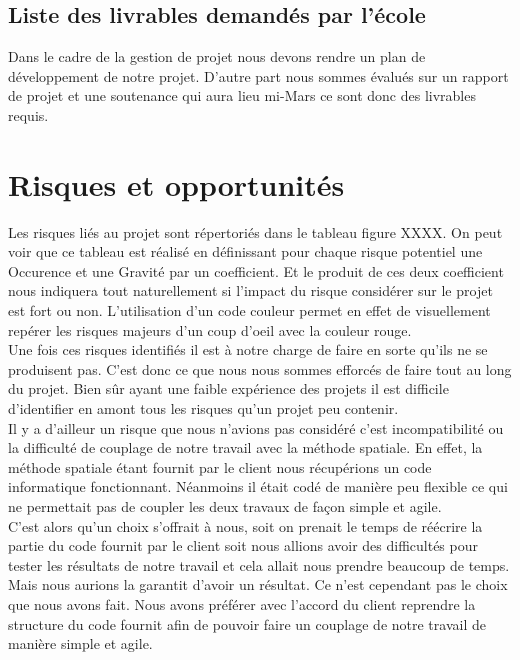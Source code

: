 \documentclass[a4paper,12pt]{report}
\theoremstyle{break}
\begin{document}
\section{Liste des livrables demandés par l’école }

    Dans le cadre de la gestion de projet nous devons rendre un plan de développement de notre projet. D’autre part nous sommes évalués sur un rapport de projet et une soutenance qui aura lieu mi-Mars ce sont donc des livrables requis. 

\chapter{Risques et opportunités}
 
  Les risques liés au projet sont répertoriés dans le tableau figure XXXX. On peut voir que ce tableau est réalisé en définissant pour chaque risque potentiel une Occurence et une Gravité par un coefficient. Et le produit de ces deux coefficient nous indiquera tout naturellement si l'impact du risque considérer sur le projet est fort ou non. L'utilisation d'un code couleur permet en effet de visuellement repérer les risques majeurs d'un coup d'oeil avec la couleur rouge. \\
  
  Une fois ces risques identifiés il est à notre charge de faire en sorte qu'ils ne se produisent pas. C'est donc ce que nous nous sommes efforcés de faire tout au long du projet. Bien sûr ayant une faible expérience des projets il est difficile d'identifier en amont tous les risques qu'un projet peu contenir. \\
  
  Il y a d'ailleur un risque que nous n’avions pas considéré c’est incompatibilité ou la difficulté de couplage de notre travail avec la méthode spatiale. En effet, la méthode spatiale étant fournit par le client nous récupérions un code informatique fonctionnant. Néanmoins il était codé de manière peu flexible ce qui ne permettait pas de coupler les deux travaux de façon simple et agile.\\
  
 C'est alors qu'un choix s'offrait à nous, soit on prenait le temps de réécrire la partie du code fournit par le client soit nous allions avoir des difficultés pour tester les résultats de notre travail et cela allait nous prendre beaucoup de temps. Mais nous aurions la garantit d'avoir un résultat. Ce n'est cependant pas le choix que nous avons fait. Nous avons préférer avec l'accord du client reprendre la structure du code fournit afin de pouvoir faire un couplage de notre travail de manière simple et agile. \\ 
 
\end{document}
